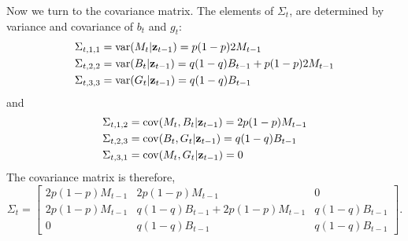 \documentclass{article}
\newcommand{\bz}{{\bf z}}
\begin{document}
Now we turn to the covariance matrix. The elements of $\Sigma_t$, are determined by variance and covariance of $b_t$ and $g_t$: 
\begin{align}
\Sigma_{t,1,1} &= {\rm var}(M_t|\bz_{t-1}) =p(1-p)2M_{t-1}\\
\Sigma_{t,2,2} &= {\rm var}(B_t|\bz_{t-1}) = q(1-q)B_{t-1}+p(1-p)2M_{t-1}\\
\Sigma_{t,3,3} &= {\rm var}(G_t|\bz_{t-1}) = q(1-q)B_{t-1}
\end{align}
and 
\begin{align}
\Sigma_{t,1,2} &={\rm cov}(M_t,B_t|\bz_{t-1}) = 2p(1-p)M_{t-1}\\
\Sigma_{t,2,3} &={\rm cov}(B_t,G_t|\bz_{t-1}) = q(1-q)B_{t-1}\\
\Sigma_{t,3,1} &={\rm cov}(M_t,G_t|\bz_{t-1}) = 0
\end{align}
The covariance matrix is therefore, 
\begin{equation}
\Sigma_{t} =\left[ \begin{array}{ccc}
2p(1-p)M_{t-1}  & 2p(1-p)M_{t-1}  & 0\\
2p(1-p)M_{t-1}  & q(1-q)B_{t-1} + 2p(1-p)M_{t-1}  & q(1-q)B_{t-1} \\
0 &q(1-q)B_{t-1} & q(1-q)B_{t-1}
\end{array}\right].
\end{equation}
\end{document}
